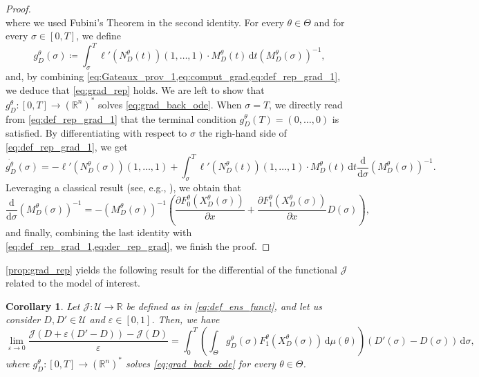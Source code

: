 \documentclass[a4paper,12pt, reqno]{amsart}
\theoremstyle{plain}
\newtheorem{corollary}[theorem]{Corollary}
\theoremstyle{definition}
\theoremstyle{remark}
\numberwithin{equation}{section}
\newcommand{\J}{\mathcal{J}}
\newcommand{\R}{\mathbb{R}}
\newcommand{\U}{\mathcal{U}}
\newcommand{\e}{\varepsilon}
\newcommand{\de}{\,\mathrm{d}}
\begin{document}
\begin{proof}
\begin{equation}
    \end{equation}
    where we used Fubini's Theorem in the second identity.
    For every $\theta\in\Theta$ and for every $\sigma\in [0,T]$, we define 
    \begin{equation} \label{eq:def_rep_grad_1}
        {g_D^\theta}(\sigma) \coloneqq \int_\sigma^T 
        \ell' \left({N_D^\theta}({t}) \right) (1,{\ldots,}1)\cdot 
        M_{D}^\theta({t}) 
        \de {t} 
    \left(M_{D}^{\theta}(\sigma) \right)^{-1},
    \end{equation}
    and, by combining \cref{eq:Gateaux_prov_1,eq:comput_grad,eq:def_rep_grad_1}, we deduce that \cref{eq:grad_rep} holds.
    We are left to show that ${g_D^\theta} \colon [0,T]\to (\R^{n})^*$ solves \cref{eq:grad_back_ode}. When $\sigma=T$, we directly read from \cref{eq:def_rep_grad_1} that the terminal condition ${g_D^\theta}(T)=(0,{\ldots,}0)$ is satisfied.
    By differentiating with respect to $\sigma$ the righ-hand side of \cref{eq:def_rep_grad_1}, we get 
    \begin{equation} \label{eq:der_rep_grad}
        \dot {g_D^\theta}(\sigma) =
        -\ell' \left({N_D^\theta}(\sigma) \right) (1,{\ldots,}1) + 
        \int_\sigma^T 
        \ell' \left({N_D^\theta}({t}) \right) (1,{\ldots,}1)\cdot 
        M_{D}^\theta({t}) 
        \de {t}
        \frac{\mathrm{d}}{\mathrm{d}\sigma}
        \left(M_{D}^{\theta}(\sigma) \right)^{-1}.
    \end{equation}
    Leveraging  a classical result (see, e.g., \cite[Theorem~2.2.3]{Bressan_Piccoli}), we obtain that
    \begin{equation*}
        \frac{\mathrm{d}}{\mathrm{d}\sigma}
        \left(M_{D}^{\theta}(\sigma) \right)^{-1} = -\left(M_{D}^{\theta}(\sigma) \right)^{-1}  \left( \frac{\partial F_0^\theta ({X_D^\theta}(\sigma))}{\partial x} +
    \frac{\partial F_1^\theta ({X_D^\theta}(\sigma))}{\partial x} {D}(\sigma) \right),
    \end{equation*}
    and finally, combining the last identity with \cref{eq:def_rep_grad_1,eq:der_rep_grad}, we finish the proof.
\end{proof}

\cref{prop:grad_rep} yields the following result for the differential of the functional $\J$ related to the model of interest.

\begin{corollary} \label{cor:rep_grad_J}
    Let $\J\colon \U\to \R$ be defined as in \cref{eq:def_ens_funct}, and let us consider ${D,D'}\in \U$ and $\e\in [0,1]$.
    Then, we have
    \begin{equation} \label{eq:grad_rep_J}
        \lim_{\e \to 0} \frac{\J({D+\e (D'-D)})- \J({D})}{\e} =
        \int_0^T  
         \left( \int_\Theta
        {g_D^\theta}(\sigma) 
         F_1^\theta \left( {X_D^\theta}(\sigma) \right)
         \de \mu(\theta)
         \right)
         {(D'(\sigma)-D(\sigma))}
         \de \sigma,
    \end{equation}
    where ${g_D^\theta} \colon [0,T]\to (\R^{n})^*$ solves \cref{eq:grad_back_ode} for every $\theta\in\Theta$.
\end{corollary}
\end{document}
